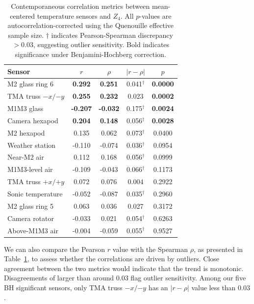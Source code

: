 \documentclass[SE,authoryear,toc]{lsstdoc}
\begin{document}
\begin{table}[h]
\centering
\small
\caption{Contemporaneous correlation metrics between mean-centered 
temperature sensors and $Z_4$. All $p$-values are 
autocorrelation-corrected using the Quenouille effective sample size. 
$\dagger$ indicates Pearson-Spearman discrepancy $> 0.03$, suggesting 
outlier sensitivity. Bold indicates significance under Benjamini-Hochberg 
correction.}
\label{tab:levels_correlations}
\begin{tabular}{lcccc}
\toprule
Sensor & $r$ & $\rho$ & $|r - \rho|$ & $p$ \\
\midrule
M2 glass ring 6      & \textbf{0.292}  & \textbf{0.251}  & 0.041$^\dagger$ & \textbf{0.0000} \\
TMA truss $-x/{-y}$         & \textbf{0.255}  & \textbf{0.232}  & 0.023           & \textbf{0.0002} \\
M1M3 glass   & \textbf{-0.207} & \textbf{-0.032} & 0.175$^\dagger$ & \textbf{0.0024} \\
Camera hexapod    & \textbf{0.204}  & \textbf{0.148}  & 0.056$^\dagger$ & \textbf{0.0028} \\
M2 hexapod        & 0.135           & 0.062           & 0.073$^\dagger$ & 0.0400          \\
Weather station       & -0.110          & -0.074          & 0.036$^\dagger$ & 0.0954          \\
Near-M2 air         & 0.112           & 0.168           & 0.056$^\dagger$ & 0.0999          \\
M1M3-level air    & -0.109          & -0.043          & 0.066$^\dagger$ & 0.1173          \\
TMA truss $+x/{+y}$        & 0.072           & 0.076           & 0.004           & 0.2922          \\
Sonic temperature          & -0.052          & -0.087          & 0.035$^\dagger$ & 0.2960          \\
M2 glass ring 5      & 0.063           & 0.036           & 0.027           & 0.3172          \\
Camera rotator   & -0.033          & 0.021           & 0.054$^\dagger$ & 0.6263          \\
Above-M1M3 air          & -0.004          & -0.059          & 0.055$^\dagger$ & 0.9527          \\
\bottomrule
\end{tabular}
\end{table}

We can also compare the Pearson $r$ value with the Spearman $\rho$, as presented in Table~\ref{tab:levels_correlations}, to assess whether the correlations are driven by outliers. Close agreement between the two metrics would indicate that the trend is monotonic. Disagreements of larger than around $0.03$ flag outlier sensitivity. Among our five BH significant sensors, only TMA truss $-x/{-y}$ has an $|r-\rho |$ value less than $0.03$.
\end{document}
